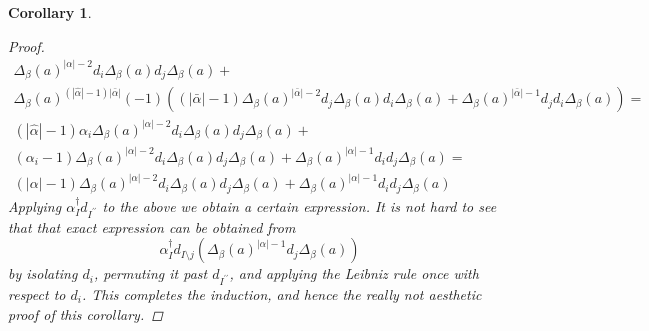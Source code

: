 \documentclass[10pt, a4paper, UKenglish]{article}
\numberwithin{equation}{section}
\newcommand{\abs}[1]{\left\vert#1\right\vert}	%
\theoremstyle{plain}
\newtheorem{cor}[equation]{Corollary}
\theoremstyle{definition}
\begin{document}
\begin{cor}
\begin{proof}
\begin{gather*}
    \Delta_\beta(a)^{\abs{\alpha} - 2} %
    d_i \Delta_\beta(a) d_j \Delta_\beta (a) %
    + \\%
    \Delta_\beta(a)^{(\abs{\hat\alpha}-1)\abs{\bar\alpha}} %
    (-1) \left( %
    (\abs{\bar\alpha}-1) %
    \Delta_\beta (a)^{\abs{\bar\alpha}-2} %
    d_j \Delta_\beta (a) d_i \Delta_\beta (a) %
    + %
    \Delta_\beta(a)^{\abs{\bar\alpha}-1} %
    d_j d_i \Delta_\beta(a)
    \right) = \\%
  (\abs{\hat\alpha}-1)\alpha_i%
    \Delta_\beta(a)^{\abs{\alpha} - 2} %
    d_i \Delta_\beta(a) d_j \Delta_\beta (a) %
    + \\%
    (\alpha_i-1) %
    \Delta_\beta(a)^{\abs{\alpha}-2} %
    d_i \Delta_\beta (a) d_j \Delta_\beta (a) %
    + %
    \Delta_\beta(a)^{\abs{\alpha}-1} %
    d_i d_j \Delta_\beta(a) = \\%
  (\abs{\alpha}-1)%
    \Delta_\beta(a)^{\abs{\alpha} - 2} %
    d_i \Delta_\beta(a) d_j \Delta_\beta (a) %
    + %
    \Delta_\beta(a)^{\abs{\alpha}-1} %
    d_i d_j \Delta_\beta(a)%
  \end{gather*}
Applying $\alpha^\dagger_I d_{I^{\prime\prime}}$ to the above we obtain a certain expression. It is not hard to see that that exact expression can be obtained from
\begin{equation*}
  \alpha^\dagger_I d_{I \setminus j} %
    ( \Delta_\beta(a)^{\abs{\alpha}-1} d_j \Delta_\beta (a) )
\end{equation*}
by isolating $d_i$, permuting it past $d_{I^{\prime\prime}}$, and applying the Leibniz rule once with respect to $d_i$. This completes the induction, and hence the really not aesthetic proof of this corollary.
\end{proof}
\end{cor}
%
%
\end{document}
